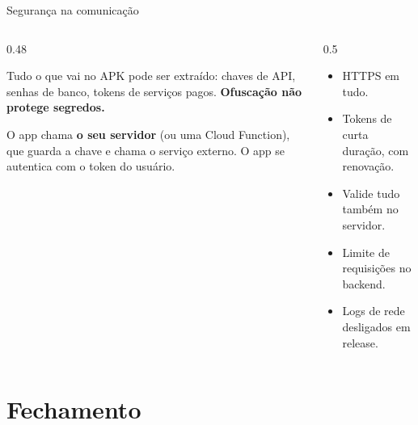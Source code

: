 \documentclass[aspectratio=169,10pt]{beamer}
\begin{document}
\begin{frame}{Segurança na comunicação}
  \begin{columns}[T]
    \begin{column}{0.48\textwidth}
      \begin{erro}
        Tudo o que vai no APK pode ser extraído: chaves de API, senhas de banco, tokens de serviços pagos. \textbf{Ofuscação não protege segredos.}
      \end{erro}
      \begin{conceito}
        O app chama \textbf{o seu servidor} (ou uma Cloud Function), que guarda a chave e chama o serviço externo. O app se autentica com o token do usuário.
      \end{conceito}
    \end{column}
    \begin{column}{0.5\textwidth}
      \centering
      \begin{dica}[Checklist]
        \begin{itemize}
          \item HTTPS em tudo.
          \item Tokens de curta duração, com renovação.
          \item Valide tudo também no servidor.
          \item Limite de requisições no backend.
          \item Logs de rede desligados em release.
        \end{itemize}
      \end{dica}
    \end{column}
  \end{columns}
\end{frame}

\section{Fechamento}
\end{document}
